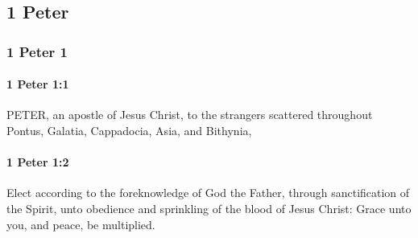 \subsection{1 Peter}
	\label{1PETER}

	\subsubsection{1 Peter 1} %
		\label{1PETER-1}
		
		\paragraph{1 Peter 1:1} %
			\label{1PETER-1-1}

			PETER, an apostle of Jesus Christ, to the strangers scattered throughout Pontus, Galatia, Cappadocia, Asia, and Bithynia,

			\begin{framed}
			\scriptsize
				\begin{compactdesc}
					\item[SBLG] 
				\end{compactdesc}
			\end{framed}

		\paragraph{1 Peter 1:2} %
			\label{1PETER-1-2}

			Elect according to the foreknowledge of God the Father, through sanctification of the Spirit, unto obedience and sprinkling of the blood of Jesus Christ: Grace unto you, and peace, be multiplied.

